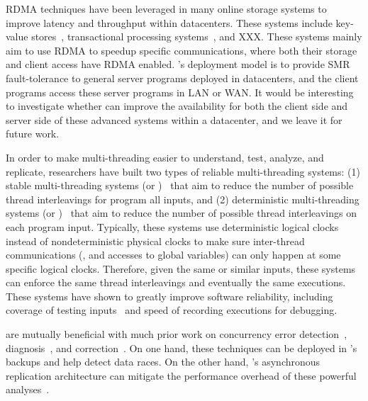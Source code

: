  RDMA techniques have been leveraged in many online 
storage systems to improve latency and throughput within datacenters. These 
systems include key-value 
stores~\cite{pilaf:usenix14,herd:sigcomm14,farm:nsdi14}, transactional 
processing systems~\cite{drtm:sosp15,farm:sosp15}, and XXX. These systems 
mainly aim to use RDMA to speedup specific communications, where both their 
storage and client access have RDMA enabled. \xxx's deployment model is to 
provide SMR fault-tolerance to general server programs deployed in datacenters, 
and the client programs access these server programs in LAN or WAN. It would be 
interesting to investigate whether \xxx can improve the availability for both 
the client side and server side of these advanced systems within a datacenter, 
and we leave it for future work.



 In order to make multi-threading easier to 
understand, test, analyze, and replicate, researchers have built two types of 
reliable multi-threading systems: (1) stable multi-threading systems (or 
\smt)~\cite{grace:oopsla09, dthreads:sosp11, determinator:osdi10} that aim to 
reduce the number of possible thread interleavings for program all inputs, and 
(2) deterministic multi-threading systems (or \dmt)~\cite{dpj:oopsla09, 
dmp:asplos09,kendo:asplos09,coredet:asplos10,dos:osdi10,ddos:asplos13,
ics:oopsla13} that aim to reduce the number of possible thread interleavings on 
each program input. Typically, these systems use deterministic logical clocks 
instead of nondeterministic physical clocks to make sure inter-thread 
communications (\eg, \mutexlock and accesses to global variables) can only 
happen at some specific logical clocks. Therefore, given the same or similar 
inputs, these systems can enforce the same thread interleavings and eventually 
the same executions. These systems 
have shown to greatly improve software reliability, including coverage of 
testing inputs~\cite{ics:oopsla13} and speed of recording 
executions\cite{dos:osdi10} for debugging.

 \xxx are mutually beneficial with much prior work on 
concurrency error 
detection~\cite{yu:racetrack:sosp,savage:eraser,racerx:sosp03,lu:muvi:sosp,
avio:asplos06,conmem:asplos10},
diagnosis~\cite{racefuzzer:pldi08,ctrigger:asplos09,atomfuzzer:fse08}, and
correction~\cite{dimmunix:osdi08,gadara:osdi08,wu:loom:osdi10,cfix:osdi12}. 
On one hand, these techniques can be deployed in \xxx's backups and help 
\xxx detect data races. On the other hand, \xxx's asynchronous replication 
architecture can mitigate the performance overhead of these powerful 
analyses~\cite{repframe:apsys15}.


